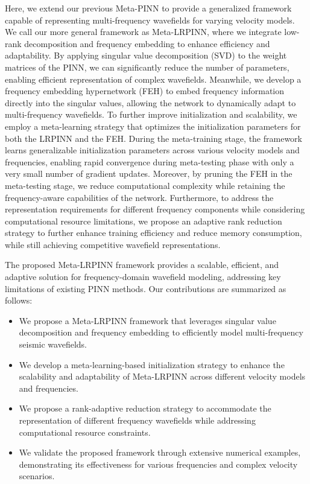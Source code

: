 Here, we extend our previous Meta-PINN to provide a generalized framework capable of representing multi-frequency wavefields for varying velocity models. We call our more general framework as Meta-LRPINN, where we integrate low-rank decomposition and frequency embedding to enhance efficiency and adaptability. By applying singular value decomposition (SVD) to the weight matrices of the PINN, we can significantly reduce the number of parameters, enabling efficient representation of complex wavefields. Meanwhile, we develop a frequency embedding hypernetwork (FEH) to embed frequency information directly into the singular values, allowing the network to dynamically adapt to multi-frequency wavefields. To further improve initialization and scalability, we employ a meta-learning strategy that optimizes the initialization parameters for both the LRPINN and the FEH. During the meta-training stage, the framework learns generalizable initialization parameters across various velocity models and frequencies, enabling rapid convergence during meta-testing phase with only a very small number of gradient updates. Moreover, by pruning the FEH in the meta-testing stage, we reduce computational complexity while retaining the frequency-aware capabilities of the network. Furthermore, to address the representation requirements for different frequency components while considering computational resource limitations, we propose an adaptive rank reduction strategy to further enhance training efficiency and reduce memory consumption, while still achieving competitive wavefield representations.

The proposed Meta-LRPINN framework provides a scalable, efficient, and adaptive solution for frequency-domain wavefield modeling, addressing key limitations of existing PINN methods. Our contributions are summarized as follows:
\begin{itemize}
    \item We propose a Meta-LRPINN framework that leverages singular value decomposition and frequency embedding to efficiently model multi-frequency seismic wavefields.
    \item We develop a meta-learning-based initialization strategy to enhance the scalability and adaptability of Meta-LRPINN across different velocity models and frequencies.
    \item We propose a rank-adaptive reduction strategy to accommodate the representation of different frequency wavefields while addressing computational resource constraints.
    \item We validate the proposed framework through extensive numerical examples, demonstrating its effectiveness for various frequencies and complex velocity scenarios. 
\end{itemize}





